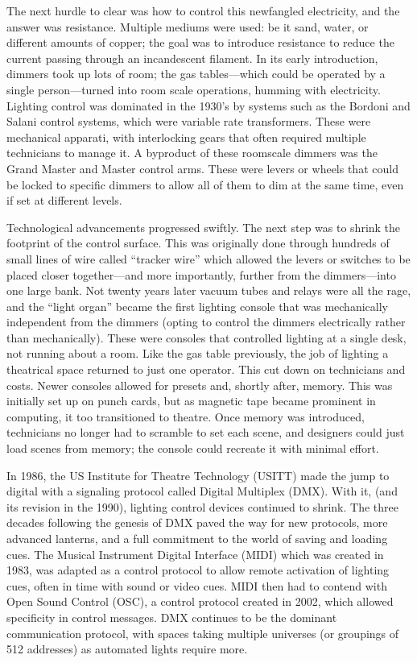 \documentclass[
    12pt,
    twoside,
    bibstyle=chicago,
    headerstyle=uppercase,
	bibfile=thesis_updating.bib
]{reedthesis}
\begin{document}
The next hurdle to clear was how to control this newfangled electricity, and the answer was resistance. Multiple mediums were used: be it sand, water, or different amounts of copper; the goal was to introduce resistance to reduce the current passing through an incandescent filament. In its early introduction, dimmers took up lots of room; the gas tables---which could be operated by a single person---turned into room scale operations, humming with electricity. Lighting control was dominated in the 1930’s by systems such as the Bordoni and Salani control systems, which were variable rate transformers. These were mechanical apparati, with interlocking gears that often required multiple technicians to manage it. A byproduct of these roomscale dimmers was the Grand Master and Master control arms. These were levers or wheels that could be locked to specific dimmers to allow all of them to dim at the same time, even if set at different levels.

Technological advancements progressed swiftly. The next step was to shrink the footprint of the control surface. This was originally done through hundreds of small lines of wire called “tracker wire” which allowed the levers or switches to be placed closer together---and more importantly, further from the dimmers---into one large bank. Not twenty years later vacuum tubes and relays were all the rage, and the “light organ” became the first lighting console that was mechanically independent from the dimmers (opting to control the dimmers electrically rather than mechanically). These were consoles that controlled lighting at a single desk, not running about a room. Like the gas table previously, the job of lighting a theatrical space returned to just one operator. This cut down on technicians and costs. Newer consoles allowed for presets and, shortly after, memory. This was initially set up on punch cards, but as magnetic tape became prominent in computing, it too transitioned to theatre. Once memory was introduced, technicians no longer had to scramble to set each scene, and designers could just load scenes from memory; the console could recreate it with minimal effort.

In 1986, the US Institute for Theatre Technology (USITT) made the jump to digital with a signaling protocol called Digital Multiplex (DMX). With it, (and its revision in the 1990), lighting control devices continued to shrink. The three decades following the genesis of DMX paved the way for new protocols, more advanced lanterns, and a full commitment to the world of saving and loading cues. The Musical Instrument Digital Interface (MIDI) which was created in 1983, was adapted as a control protocol to allow remote activation of lighting cues, often in time with sound or video cues. MIDI then had to contend with Open Sound Control (OSC), a control protocol created in 2002, which allowed specificity in control messages. DMX continues to be the dominant communication protocol, with spaces taking multiple universes (or groupings of 512 addresses) as automated lights require more. 
\end{document}
